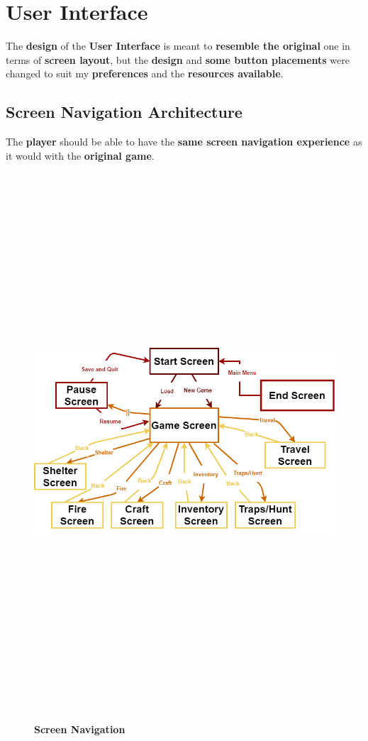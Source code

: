 	\section{User Interface}
		The \textbf{design} of the \textbf{User Interface} is meant to \textbf{resemble the original} one in terms of \textbf{screen layout}, but the \textbf{design} and \textbf{some button placements} were changed to suit my \textbf{preferences} and the \textbf{resources available}.

		\subsection{Screen Navigation Architecture}
			The \textbf{player} should be able to have the \textbf{same screen navigation experience} as it would with the \textbf{original game}. 
		\begin{figure}[H]
			\centering
			\includegraphics[width=15cm, height=20cm, keepaspectratio]{Images/ScreenArchitecture.png}\\
			\caption{\textbf{Screen Navigation}}
		\end{figure}

